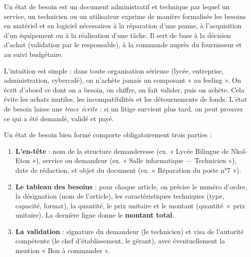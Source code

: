 \documentclass[11pt]{article}
\newcommand{\cle}[1]{{\popxbold\color{popdark}#1}}
\begin{document}
\begin{definition}
Un \cle{état de besoin} est un document administratif et technique par lequel un service, un technicien ou un utilisateur exprime de manière formalisée les \cle{besoins en matériel et en logiciel} nécessaires à la réparation d'une panne, à l'acquisition d'un équipement ou à la réalisation d'une tâche. Il sert de base à la décision d'achat (validation par le responsable), à la commande auprès du fournisseur et au suivi budgétaire.
\end{definition}

L'intuition est simple : dans toute organisation sérieuse (lycée, entreprise, administration, cybercafé), on n'achète jamais un composant « au feeling ». On écrit d'abord ce dont on a besoin, on chiffre, on fait valider, puis on achète. Cela évite les achats inutiles, les incompatibilités et les détournements de fonds. L'état de besoin laisse une \emph{trace écrite} : si un litige survient plus tard, on peut prouver ce qui a été demandé, validé et payé.

\begin{propriete}
Un état de besoin bien formé comporte obligatoirement trois parties :
\begin{enumerate}
\item \textbf{L'en-tête} : nom de la structure demanderesse (ex. « Lycée Bilingue de Nkol-Eton »), service ou demandeur (ex. « Salle informatique — Technicien »), date de rédaction, et objet du document (ex. « Réparation du poste n°7 »).
\item \textbf{Le tableau des besoins} : pour chaque article, on précise le numéro d'ordre, la \cle{désignation} (nom de l'article), les \cle{caractéristiques techniques} (type, capacité, format), la \cle{quantité}, le \cle{prix unitaire} et le \cle{montant} (quantité $\times$ prix unitaire). La dernière ligne donne le \textbf{montant total}.
\item \textbf{La validation} : signature du demandeur (le technicien) et visa de l'autorité compétente (le chef d'établissement, le gérant), avec éventuellement la mention « Bon à commander ».
\end{enumerate}
\end{propriete}
\end{document}
